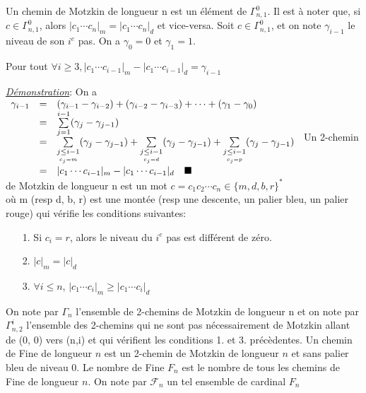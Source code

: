 Un chemin de Motzkin de longueur n est un élément de $\Gamma_{n, 1}^{0}$. Il est à noter que, si $c \in \Gamma_{n, 1}^{0}$,
alors $|c_{1} \cdots c_{n}|_{m} = |c_{1} \cdots c_{n}|_{d}$ et vice-versa. Soit $c \in \Gamma_{n, 1}^{0}$, et on note $
	\gamma_{i-1}$ le niveau
de son $i^e$ pas. On a $\gamma_{0}=0$ et $\gamma_{1} = 1$.

\begin{proposition} \label{levelOfPath}
	Pour tout $\forall i \geq 3, |c_{1} \cdots c_{i-1}|_{m} - |c_{1} \cdots c_{i-1}|_{d} = \gamma_{i-1}$
\end{proposition}
\underline{\textit{Démonstration}}: On a \\
\vspace{5pt}
$
	\begin{array}{c c l}
		\gamma_{i-1} & = & (\gamma_{i-1}-\gamma_{i-2})+(\gamma_{i-2}-\gamma_{i-3})+\cdots+(\gamma_{1}-\gamma_{0})                           \\
		             & = & \underset{j=1}{\overset{i-1}{\sum}}(\gamma_{j}-\gamma_{j-1})                                                     \\
		             & = & \underset{\underset{c_{j}=m}{j\leq i-1}}{\sum}(\gamma_{j}-\gamma_{j-1})+\underset{\underset{c_{j}=d}{j\leq i-1}}
		{\sum}(\gamma_{j}-\gamma_{j-1})+\underset{\underset{c_{j}=p}{j\leq i-1}}{\sum}(\gamma_{j}-\gamma_{j-1})                             \\
		             & = & |c_{1}\cdots c_{i-1}|_m-|c_{1}\cdots c_{i-1}|_d \hspace{10pt}\blacksquare
	\end{array}
$\vspace{15pt}
Un 2-chemin de Motzkin de longueur n est un mot $c = c_{1}c_{2}\cdots c_{n} \in \{m,d,b,r\}^{*}$\\ où m (resp d, b, r) est
une montée (resp une descente, un palier bleu, un palier rouge) qui vérifie les conditions suivantes:
\begin{itemize}
	\item[1.] Si $c_{i}=r$, alors le niveau du $i^e$ pas est différent de zéro.
	\item[2.] $|c|_{m}=|c|_{d}$
	\item[3.] $\forall i \leq n$, $|c_{1}\cdots c_{i}|_{m}\geq |c_{1}\cdots c_{i}|_{d}$
\end{itemize} \newpage
On note par $\Gamma_{n}$ l'ensemble de 2-chemins de Motzkin de longueur n et on note par $\Gamma_{n, 2}^{i}$ l'ensemble des
2-chemins qui ne sont pas nécessairement de Motzkin allant de (0, 0) vers (n,i) et qui vérifient les conditions 1. et 3.
précèdentes.
Un chemin de Fine de longueur $n$ est un  2-chemin de Motzkin de longueur $n$ et sans palier bleu de niveau 0. Le nombre de
Fine $F_{n}$ est le nombre de tous les chemins de Fine de longueur $n$. On note par $\mathcal{F}_{n}$ un tel ensemble de cardinal $F_{n}$
\\

